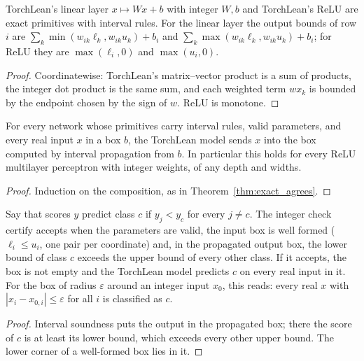 \begin{lemma}\label{lem:exact_primitives}
\leanok
{}
TorchLean's linear layer $x\mapsto Wx+b$ with integer $W,b$ and TorchLean's ReLU are exact
primitives with interval rules. For the linear layer the output bounds of row $i$ are
$\sum_k \min(w_{ik}\ell_k, w_{ik}u_k)+b_i$ and $\sum_k \max(w_{ik}\ell_k, w_{ik}u_k)+b_i$; for ReLU
they are $\max(\ell_i,0)$ and $\max(u_i,0)$.
\end{lemma}
\begin{proof}
\leanok
Coordinatewise: TorchLean's matrix--vector product is a sum of products, the integer dot product
is the same sum, and each weighted term $w x_k$ is bounded by the endpoint chosen by the sign of $w$.
ReLU is monotone.
\end{proof}

\begin{theorem}\label{thm:box_sound}
\leanok
{}
For every network whose primitives carry interval rules, valid parameters, and every real input $x$
in a box $b$, the TorchLean model sends $x$ into the box computed by interval propagation from $b$.
In particular this holds for every ReLU multilayer perceptron with integer weights, of any depth
and widths.
\end{theorem}
\begin{proof}
\leanok
Induction on the composition, as in Theorem~\ref{thm:exact_agrees}.
\end{proof}

\begin{theorem}\label{thm:region_certificate}
\leanok
{}
Say that scores $y$ predict class $c$ if $y_j<y_c$ for every $j\ne c$. The integer check
$\mathrm{certify}$ accepts when the parameters are valid, the input box is well formed
($\ell_i\le u_i$, one pair per coordinate) and, in the propagated output box, the lower bound of
class $c$ exceeds the upper bound of every other class. If it accepts, the box is not empty and the
TorchLean model predicts $c$ on every real input in it. For the box of radius $\varepsilon$ around an
integer input $x_0$, this reads: every real $x$ with $|x_i-x_{0,i}|\le\varepsilon$ for all $i$ is
classified as $c$.
\end{theorem}
\begin{proof}
\leanok
Interval soundness puts the output in the propagated box; there the score of $c$ is at least its
lower bound, which exceeds every other upper bound. The lower corner of a well-formed box lies in
it.
\end{proof}

